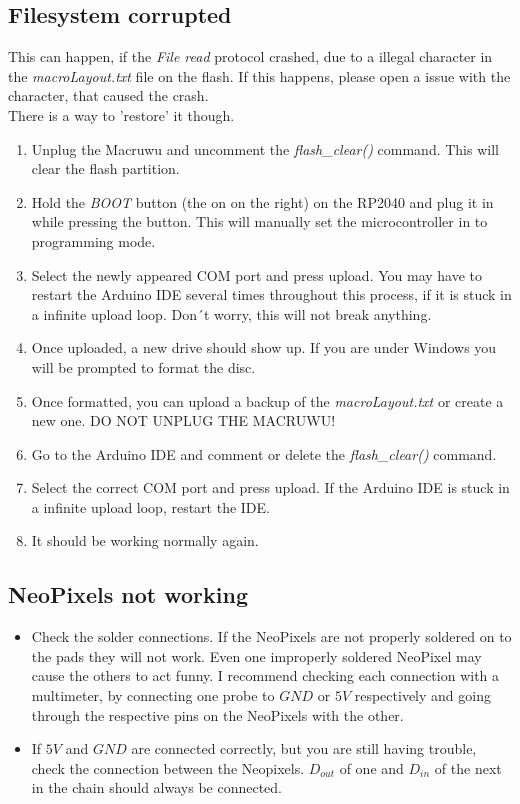 \documentclass[english, 12pt]{scrartcl}
\begin{document}
	\subsection{Filesystem corrupted}
	This can happen, if the \textit{File read} protocol crashed, due to a illegal character in the \textit{macroLayout.txt} file on the flash. If this happens, please open a issue with the character, that caused the crash.\\
	There is a way to 'restore' it though.
	\begin{enumerate}
		\item Unplug the Macruwu and uncomment the \textit{flash\_clear()} command. This will clear the flash partition.
		\item Hold the \textit{BOOT} button (the on on the right) on the RP2040 and plug it in while pressing the button. This will manually set the microcontroller in to programming mode.
		\item Select the newly appeared COM port and press upload. You may have to restart the Arduino IDE several times throughout this process, if it is stuck in a infinite upload loop. Don´t worry, this will not break anything.
		\item Once uploaded, a new drive should show up. If you are under Windows you will be prompted to format the disc.
		\item Once formatted, you can upload a backup of the \textit{macroLayout.txt} or create a new one. DO NOT UNPLUG THE MACRUWU!
		\item Go to the Arduino IDE and comment or delete the \textit{flash\_clear()} command.
		\item Select the correct COM port and press upload. If the Arduino IDE is stuck in a infinite upload loop, restart the IDE. 
		\item It should be working normally again.
	\end{enumerate}
	\subsection{NeoPixels not working}
	\begin{itemize}
		\item Check the solder connections. If the NeoPixels are not properly soldered on to the pads they will not work. Even one improperly soldered NeoPixel may cause the others to act funny. I recommend checking each connection with a multimeter, by connecting one probe to $GND$ or $5V$ respectively and going through the respective pins on the NeoPixels with the other.
		\item If $5V$ and $GND$ are connected correctly, but you are still having trouble, check the connection between the Neopixels. $D_{out}$ of one and $D_{in}$ of the next in the chain should always be connected.
	\end{itemize}
\end{document}
